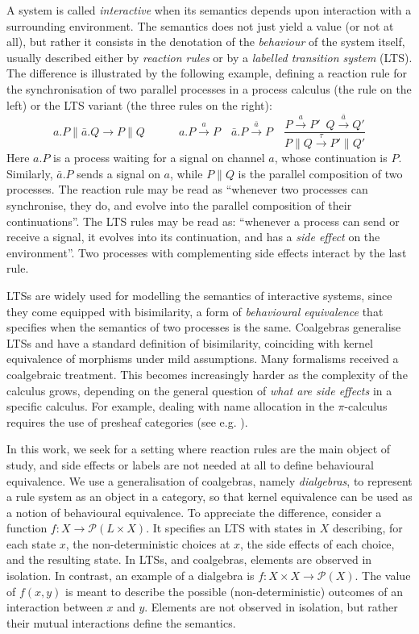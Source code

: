 \documentclass[orivec]{llncs}
\newcommand{\tr}[1]{\stackrel{#1}{\longrightarrow}}
\newcommand{\utr}{\to}
\newcommand{\Pow}{\mathcal{P}}
\begin{document}
A system is called \emph{interactive} when its semantics depends upon interaction with a surrounding environment. The semantics does not just yield a value (or not at all), but rather it consists in the denotation of the \emph{behaviour} of the system itself, usually described either by \emph{reaction rules} or by a \emph{labelled transition system} (LTS). The difference is illustrated by the following example, defining a reaction rule for the synchronisation of two parallel processes in a process calculus (the rule on the left) or the LTS  variant (the three rules on the right):
$$ {a . P \parallel \bar a . Q \utr P \parallel Q} \quad \quad \quad {a . P \tr a P} \quad {\bar a . P \tr {\bar a} P} \quad \frac{P \tr{a} P' \,\,\, Q \tr{\bar a} Q'}{P \parallel Q \tr{\tau} P' \parallel Q'}$$
Here $a . P$ is a process waiting for a signal on channel $a$, whose continuation is $P$. Similarly, $\bar a .P$ sends a signal on $a$, while $P \parallel Q$ is the parallel composition of two processes. The reaction rule may be read as ``whenever two processes can synchronise, they do, and evolve into the parallel composition of their continuations''. The LTS rules may be read as: ``whenever a process can send or receive a signal, it evolves into its continuation, and has a \emph{side effect} on the environment''. Two processes with complementing side effects interact by the last rule. 



LTSs are widely used for modelling the semantics of interactive systems, since they come equipped with bisimilarity, a form of \emph{behavioural equivalence} that specifies when the semantics of two processes is the same. Coalgebras generalise LTSs and have a standard definition of bisimilarity, coinciding with kernel equivalence of morphisms under mild assumptions. Many formalisms received a coalgebraic treatment. This becomes increasingly harder as the complexity of the calculus grows, depending on the general question of \emph{what are side effects} in a specific calculus. For example, dealing with name allocation in the $\pi$-calculus requires the use of presheaf categories (see e.g. \cite{ft99}). 



In this work, we seek for a setting where reaction rules are the main object of study, and side effects or labels are not needed at all to define behavioural equivalence.
We
use a generalisation of coalgebras, namely \emph{dialgebras}, to represent a rule system as an object in a category, so that kernel equivalence can be used as a notion of behavioural equivalence.
To appreciate the difference, consider a function $f : X \to \Pow(L \times X)$. It specifies an LTS with states in $X$ describing, for each state $x$, the non-deterministic choices at $x$, the side effects of each choice, and the resulting state. In LTSs, and coalgebras, elements are observed in isolation. In contrast, an example of a dialgebra is $f : X \times X \to \Pow(X)$. The value of $f(x,y)$ is meant to describe the possible (non-deterministic) outcomes of an interaction between $x$ and $y$. Elements are not observed in isolation, but rather their mutual interactions define the semantics.
\end{document}

